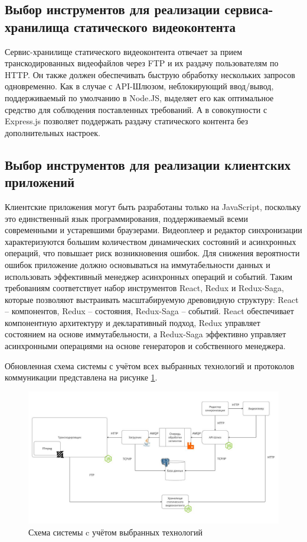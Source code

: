 	\subsection{Выбор инструментов для реализации сервиса-хранилища статического видеоконтента}

	Сервис-хранилище статического видеоконтента отвечает за прием транскодированных видеофайлов через FTP и их раздачу пользователям по HTTP. Он также должен обеспечивать быструю обработку нескольких запросов одновременно. Как в случае с API-Шлюзом, неблокирующий ввод/вывод, поддерживаемый по умолчанию в Node.JS, выделяет его как оптимальное средство для соблюдения поставленных требований. А в совокупности с Express.js позволяет поддержать раздачу статического контента без дополнительных настроек.

	\subsection{Выбор инструментов для реализации клиентских приложений}

	Клиентские приложения могут быть разработаны только на JavaScript, поскольку это единственный язык программирования, поддерживаемый всеми современными и устаревшими браузерами. Видеоплеер и редактор синхронизации характеризуются большим количеством динамических состояний и асинхронных операций, что повышает риск возникновения ошибок. Для снижения вероятности ошибок приложение должно основываться на иммутабельности данных и использовать эффективный менеджер асинхронных операций и событий. Таким требованиям соответствует набор инструментов React, Redux и Redux-Saga, которые позволяют выстраивать масштабируемую древовидную структуру: React – компонентов, Redux – состояния, Redux-Saga – событий. React обеспечивает компонентную архитектуру и декларативный подход, Redux управляет состоянием на основе иммутабельности, а Redux-Saga эффективно управляет асинхронными операциями на основе генераторов и собственного менеджера.

	Обновленная схема системы с учётом всех выбранных технологий и протоколов коммуникации представлена на рисунке \ref{fig:system_scheme_5}.
	\begin{figure}[ht!] 
		\center
		\includegraphics [scale=0.35] {my_folder/images//system_scheme_5}
		\caption{Схема системы c учётом выбранных технологий} 
		\label{fig:system_scheme_5}  
	\end{figure}

